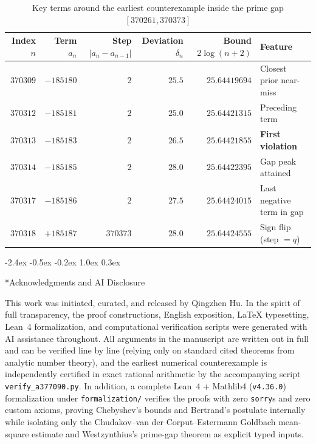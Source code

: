 \documentclass[11pt,a4paper]{article}
\makeatletter
\renewcommand{\section}{\@startsection{section}{1}{\z@}%
  {-2.4ex \@plus -0.5ex \@minus -0.2ex}%
  {1.0ex \@plus 0.3ex}%
  {\Large\bfseries\sffamily\color{ink}\raggedright}}
\theoremstyle{entheorem}
\theoremstyle{enremark}
\newcommand{\de}{\delta}
\makeatother
\begin{document}
\begin{table}[htbp]
\centering
\small
\setlength{\tabcolsep}{5pt}
\caption{Key terms around the earliest counterexample inside the prime gap $[370261, 370373]$}
\label{tab:counterexample}
\vspace{4pt}
\begin{tabular}{@{}rrrrrl@{}}
\toprule
Index $n$ & Term $a_n$ & Step $|a_n - a_{n-1}|$ & Deviation $\de_n$ & Bound $2\log(n+2)$ & Feature \\
\midrule
$370309$ & $-185180$ & $2$      & $25.5$ & $25.64419694$ & Closest prior near-miss \\
$370312$ & $-185181$ & $2$      & $25.0$ & $25.64421315$ & Preceding term \\
$370313$ & $-185183$ & $2$      & $26.5$ & $25.64421855$ & \textbf{First violation} \\
$370314$ & $-185185$ & $2$      & $28.0$ & $25.64422395$ & Gap peak attained \\
$370317$ & $-185186$ & $2$      & $27.5$ & $25.64424015$ & Last negative term in gap \\
$370318$ & $+185187$ & $370373$ & $28.0$ & $25.64424555$ & Sign flip (step $= q$) \\
\bottomrule
\end{tabular}
\end{table}

\section*{Acknowledgments and AI Disclosure}

This work was initiated, curated, and released by Qingzhen Hu. In the spirit of full transparency, the proof constructions, English exposition, \LaTeX{} typesetting, Lean~4 formalization, and computational verification scripts were generated with AI assistance throughout. All arguments in the manuscript are written out in full and can be verified line by line (relying only on standard cited theorems from analytic number theory), and the earliest numerical counterexample is independently certified in exact rational arithmetic by the accompanying script \texttt{verify\_a377090.py}. In addition, a complete Lean~4 + Mathlib4 (\texttt{v4.36.0}) formalization under \texttt{formalization/} verifies the proofs with zero \texttt{sorry}s and zero custom axioms, proving Chebyshev's bounds and Bertrand's postulate internally while isolating only the Chudakov--van der Corput--Estermann Goldbach mean-square estimate and Westzynthius's prime-gap theorem as explicit typed inputs.
\end{document}

